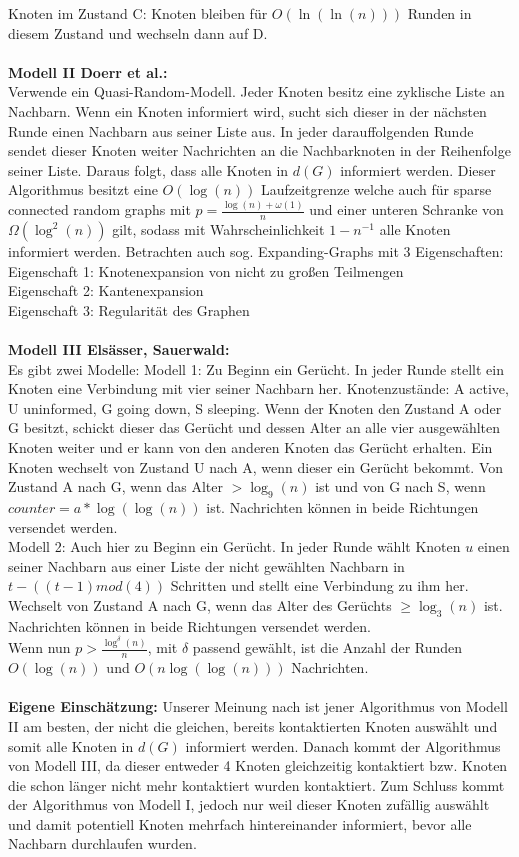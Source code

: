 \documentclass[12pt,a4paper]{report}
\begin{document}
Knoten im Zustand C: Knoten bleiben für $O(\ln(\ln(n)))$ Runden in diesem Zustand und wechseln dann auf D.
\\
\\
\textbf{Modell II Doerr et al.:}\\
Verwende ein Quasi-Random-Modell. Jeder Knoten besitz eine zyklische Liste an Nachbarn. Wenn ein Knoten informiert wird, sucht sich dieser in der nächsten Runde einen Nachbarn aus seiner Liste aus. In jeder darauffolgenden Runde sendet dieser Knoten weiter Nachrichten an die Nachbarknoten in der Reihenfolge seiner Liste. Daraus folgt, dass alle Knoten in $d(G)$ informiert werden. Dieser Algorithmus besitzt eine $O(\log(n))$ Laufzeitgrenze welche auch für sparse connected random graphs mit $p=\frac{\log(n)+\omega(1)}{n}$ und einer unteren Schranke von $\Omega(\log^2(n))$ gilt, sodass mit Wahrscheinlichkeit $1-n^{-1}$ alle Knoten informiert werden. Betrachten auch sog. Expanding-Graphs mit 3 Eigenschaften:\\
Eigenschaft 1: Knotenexpansion von nicht zu großen Teilmengen\\
Eigenschaft 2: Kantenexpansion\\
Eigenschaft 3: Regularität des Graphen
\\
\\
\textbf{Modell III Elsässer, Sauerwald:}\\
Es gibt zwei Modelle: Modell 1: Zu Beginn ein Gerücht. In jeder Runde stellt ein Knoten eine Verbindung mit vier seiner Nachbarn her. Knotenzustände: A active, U uninformed, G going down, S sleeping. Wenn der Knoten den Zustand A oder G besitzt, schickt dieser das Gerücht und dessen Alter an alle vier ausgewählten Knoten weiter und er kann von den anderen Knoten das Gerücht erhalten. Ein Knoten wechselt von Zustand U nach A, wenn dieser ein Gerücht bekommt.
Von Zustand A nach G, wenn das Alter $>\log_9(n)$ ist und von G nach S, wenn $counter = a*\log(\log(n))$ ist. Nachrichten können in beide Richtungen versendet werden.\\
Modell 2: Auch hier zu Beginn ein Gerücht. In jeder Runde wählt Knoten $u$ einen seiner Nachbarn aus einer Liste der nicht gewählten Nachbarn in $t-((t-1)mod(4))$ Schritten und stellt eine Verbindung zu ihm her. Wechselt von Zustand A nach G, wenn das Alter des Gerüchts $\ge \log_3(n)$ ist. Nachrichten können in beide Richtungen versendet werden.\\
Wenn nun $p>\frac{\log^{\delta}(n)}{n}$, mit $\delta$ passend gewählt, ist die Anzahl der Runden $O(\log(n))$ und $O(n\log(\log(n)))$ Nachrichten.
\\
\\
\textbf{Eigene Einschätzung:} Unserer Meinung nach ist jener Algorithmus von Modell II am besten, der nicht die gleichen, bereits kontaktierten Knoten auswählt und somit alle Knoten in $d(G)$ informiert werden. Danach kommt der Algorithmus von Modell III, da dieser entweder 4 Knoten gleichzeitig kontaktiert bzw. Knoten die schon länger nicht mehr kontaktiert wurden kontaktiert. Zum Schluss kommt der Algorithmus von Modell I, jedoch nur weil dieser Knoten zufällig auswählt und damit potentiell Knoten mehrfach hintereinander informiert, bevor alle Nachbarn durchlaufen wurden.
\end{document}
